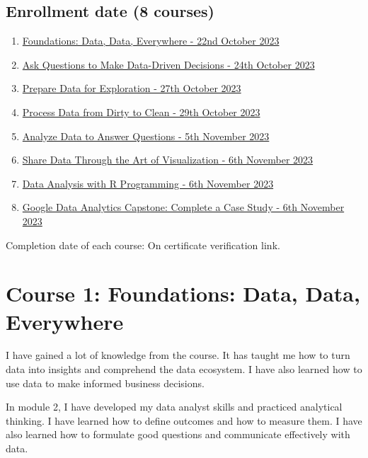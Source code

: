 \documentclass[]{article}
\begin{document}
\subsection{Enrollment date (8 courses)}
\begin{enumerate}
  \item \href{https://www.coursera.org/account/accomplishments/certificate/S9CWWMGFJAMM}{Foundations: Data, Data, Everywhere - 22nd October 2023}
  \item \href{https://www.coursera.org/account/accomplishments/certificate/ZA7TH6KEEEPB}{Ask Questions to Make Data-Driven Decisions - 24th October 2023}
  \item \href{https://www.coursera.org/account/accomplishments/certificate/B7PZ38G3U9XR}{Prepare Data for Exploration - 27th October 2023}
  \item \href{https://www.coursera.org/account/accomplishments/certificate/DYHS63889XUN}{Process Data from Dirty to Clean - 29th October 2023}
  \item \href{https://www.coursera.org/account/accomplishments/certificate/6478SYGTR4HF}{Analyze Data to Answer Questions - 5th November 2023}
  \item \href{https://www.coursera.org/account/accomplishments/certificate/8JULNPUM3GLC}{Share Data Through the Art of Visualization - 6th November 2023}
  \item \href{https://www.coursera.org/account/accomplishments/certificate/JPHDNMYYDJZ9}{Data Analysis with R Programming - 6th November 2023}
  \item \href{https://www.coursera.org/account/accomplishments/certificate/7TN58662AD9X}{Google Data Analytics Capstone: Complete a Case Study - 6th November 2023}
\end{enumerate}
Completion date of each course: On certificate verification link.

\section{Course 1: Foundations: Data, Data, Everywhere}
I have gained a lot of knowledge from the course. It has taught me how to turn data into insights and comprehend the data ecosystem. I have also learned how to use data to make informed business decisions.

In module 2, I have developed my data analyst skills and practiced analytical thinking. I have learned how to define outcomes and how to measure them. I have also learned how to formulate good questions and communicate effectively with data.
\end{document}
